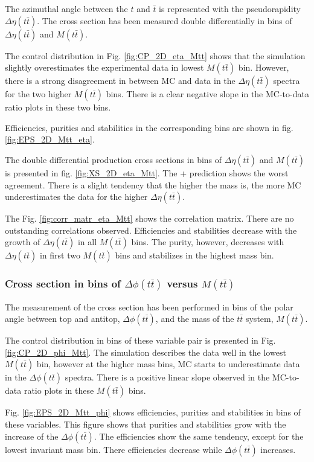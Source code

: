 The azimuthal angle between the $t$ and $\bar{t}$ is represented with the pseudorapidity $\Delta\eta(t\bar{t})$. The cross section has been measured
double differentially in bins of $\Delta\eta(t\bar{t})$ and $M(t\bar{t})$.

The control distribution in Fig. \ref{fig:CP_2D_eta_Mtt} shows that the simulation slightly overestimates the experimental data in lowest $M(t\bar{t})$
bin. However, there is a strong disagreement in between MC and data in the $\Delta\eta(t\bar{t})$ spectra for the two higher $M(t\bar{t})$ bins. There is a 
clear negative slope in the MC-to-data ratio plots in these two bins.

Efficiencies, purities and stabilities in the corresponding bins are shown in fig. \ref{fig:EPS_2D_Mtt_eta}.

The double differential production cross sections in bins of $\Delta\eta(t\bar{t})$ and $M(t\bar{t})$ is presented in fig. \ref{fig:XS_2D_eta_Mtt}. The \MG + \PYTHIA
prediction shows the worst agreement. There is a slight tendency that the higher the mass is, the more MC underestimates the data for the higher $\Delta\eta(t\bar{t})$.

The Fig. \ref{fig:corr_matr_eta_Mtt} shows the correlation matrix. There are no outstanding correlations observed. Efficiencies and stabilities decrease with the
growth of $\Delta\eta(t\bar{t})$ in all $M(t\bar{t})$ bins. The purity, however, decreases with $\Delta\eta(t\bar{t})$ in first two $M(t\bar{t})$ bins and stabilizes
in the highest mass bin.

\subsubsection{Cross section in bins of $\Delta\phi(t\bar{t})$ versus $M(t\bar{t})$}

The measurement of the cross section has been performed in bins of the polar angle between top and antitop, $\Delta\phi(t\bar{t})$, and the mass
of the $t\bar{t}$ system, $M(t\bar{t})$.

The control distribution in bins of these variable pair is presented in Fig. \ref{fig:CP_2D_phi_Mtt}. The simulation describes the data well in the lowest $M(t\bar{t})$ bin, 
however at the higher mass bins, MC starts to underestimate data in the $\Delta\phi(t\bar{t})$ spectra. There is a positive linear slope observed in the MC-to-data ratio plots
in these $M(t\bar{t})$ bins.

Fig. \ref{fig:EPS_2D_Mtt_phi} shows efficiencies, purities and stabilities in bins of these variables. This figure shows that purities and stabilities grow with the 
increase of the $\Delta\phi(t\bar{t})$. The efficiencies show the same tendency, except for the lowest invariant mass bin. There efficiencies decrease while $\Delta\phi(t\bar{t})$
increases.


